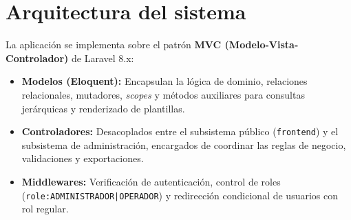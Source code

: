 \section{Arquitectura del sistema}
La aplicación se implementa sobre el patrón \textbf{MVC (Modelo-Vista-Controlador)} de Laravel 8.x:

\begin{itemize}
    \item \textbf{Modelos (Eloquent):} Encapsulan la lógica de dominio, relaciones relacionales, mutadores, \textit{scopes} y métodos auxiliares para consultas jerárquicas y renderizado de plantillas.
    \item \textbf{Controladores:} Desacoplados entre el subsistema público (\texttt{frontend}) y el subsistema de administración, encargados de coordinar las reglas de negocio, validaciones y exportaciones.
    \item \textbf{Middlewares:} Verificación de autenticación, control de roles (\texttt{role:ADMINISTRADOR|\allowbreak OPERADOR}) y redirección condicional de usuarios con rol regular.
\end{itemize}
